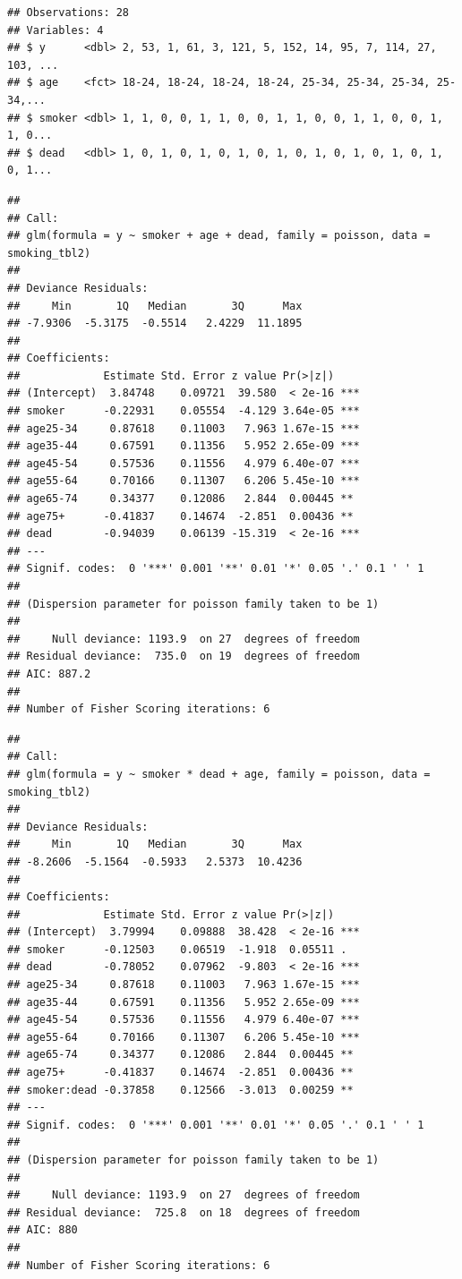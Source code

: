 \documentclass[]{article}
\begin{document}
\begin{verbatim}
## Observations: 28
## Variables: 4
## $ y      <dbl> 2, 53, 1, 61, 3, 121, 5, 152, 14, 95, 7, 114, 27, 103, ...
## $ age    <fct> 18-24, 18-24, 18-24, 18-24, 25-34, 25-34, 25-34, 25-34,...
## $ smoker <dbl> 1, 1, 0, 0, 1, 1, 0, 0, 1, 1, 0, 0, 1, 1, 0, 0, 1, 1, 0...
## $ dead   <dbl> 1, 0, 1, 0, 1, 0, 1, 0, 1, 0, 1, 0, 1, 0, 1, 0, 1, 0, 1...
\end{verbatim}

\begin{verbatim}
## 
## Call:
## glm(formula = y ~ smoker + age + dead, family = poisson, data = smoking_tbl2)
## 
## Deviance Residuals: 
##     Min       1Q   Median       3Q      Max  
## -7.9306  -5.3175  -0.5514   2.4229  11.1895  
## 
## Coefficients:
##             Estimate Std. Error z value Pr(>|z|)    
## (Intercept)  3.84748    0.09721  39.580  < 2e-16 ***
## smoker      -0.22931    0.05554  -4.129 3.64e-05 ***
## age25-34     0.87618    0.11003   7.963 1.67e-15 ***
## age35-44     0.67591    0.11356   5.952 2.65e-09 ***
## age45-54     0.57536    0.11556   4.979 6.40e-07 ***
## age55-64     0.70166    0.11307   6.206 5.45e-10 ***
## age65-74     0.34377    0.12086   2.844  0.00445 ** 
## age75+      -0.41837    0.14674  -2.851  0.00436 ** 
## dead        -0.94039    0.06139 -15.319  < 2e-16 ***
## ---
## Signif. codes:  0 '***' 0.001 '**' 0.01 '*' 0.05 '.' 0.1 ' ' 1
## 
## (Dispersion parameter for poisson family taken to be 1)
## 
##     Null deviance: 1193.9  on 27  degrees of freedom
## Residual deviance:  735.0  on 19  degrees of freedom
## AIC: 887.2
## 
## Number of Fisher Scoring iterations: 6
\end{verbatim}

\begin{verbatim}
## 
## Call:
## glm(formula = y ~ smoker * dead + age, family = poisson, data = smoking_tbl2)
## 
## Deviance Residuals: 
##     Min       1Q   Median       3Q      Max  
## -8.2606  -5.1564  -0.5933   2.5373  10.4236  
## 
## Coefficients:
##             Estimate Std. Error z value Pr(>|z|)    
## (Intercept)  3.79994    0.09888  38.428  < 2e-16 ***
## smoker      -0.12503    0.06519  -1.918  0.05511 .  
## dead        -0.78052    0.07962  -9.803  < 2e-16 ***
## age25-34     0.87618    0.11003   7.963 1.67e-15 ***
## age35-44     0.67591    0.11356   5.952 2.65e-09 ***
## age45-54     0.57536    0.11556   4.979 6.40e-07 ***
## age55-64     0.70166    0.11307   6.206 5.45e-10 ***
## age65-74     0.34377    0.12086   2.844  0.00445 ** 
## age75+      -0.41837    0.14674  -2.851  0.00436 ** 
## smoker:dead -0.37858    0.12566  -3.013  0.00259 ** 
## ---
## Signif. codes:  0 '***' 0.001 '**' 0.01 '*' 0.05 '.' 0.1 ' ' 1
## 
## (Dispersion parameter for poisson family taken to be 1)
## 
##     Null deviance: 1193.9  on 27  degrees of freedom
## Residual deviance:  725.8  on 18  degrees of freedom
## AIC: 880
## 
## Number of Fisher Scoring iterations: 6
\end{verbatim}
\end{document}
